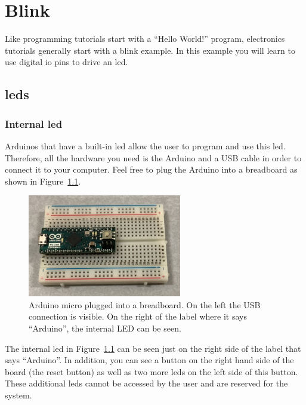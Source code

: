
\chapter{Blink}

Like programming tutorials start with a ``Hello World!'' program, electronics tutorials generally start with a blink example. In this example you will learn to use digital \ac{io} pins to drive an \ac{led}. 

\section{\Acp{led}}

\subsection{Internal \ac{led}}

Arduinos that have a built-in \ac{led} allow the user to program and use this \ac{led}. Therefore, all the hardware you need is the Arduino and a USB cable in order to connect it to your computer. Feel free to plug the Arduino into a breadboard as shown in Figure~\ref{fig:blink:arduino_alone}.
\begin{figure}[htb]
    \centering
    \includegraphics[width=0.6\textwidth]{graphics/01_blink/arduino_alone.jpg}
    \caption{Arduino micro plugged into a breadboard. On the left the USB connection is visible. On the right of the label where it says ``Arduino'', the internal LED can be seen.}
    \label{fig:blink:arduino_alone}
\end{figure}
The internal \ac{led} in Figure~\ref{fig:blink:arduino_alone} can be seen just on the right side of the label that says ``Arduino''. In addition, you can see a button on the right hand side of the board (the reset button) as well as two more \acp{led} on the left side of this button. These additional \acp{led} cannot be accessed by the user and are reserved for the system.


